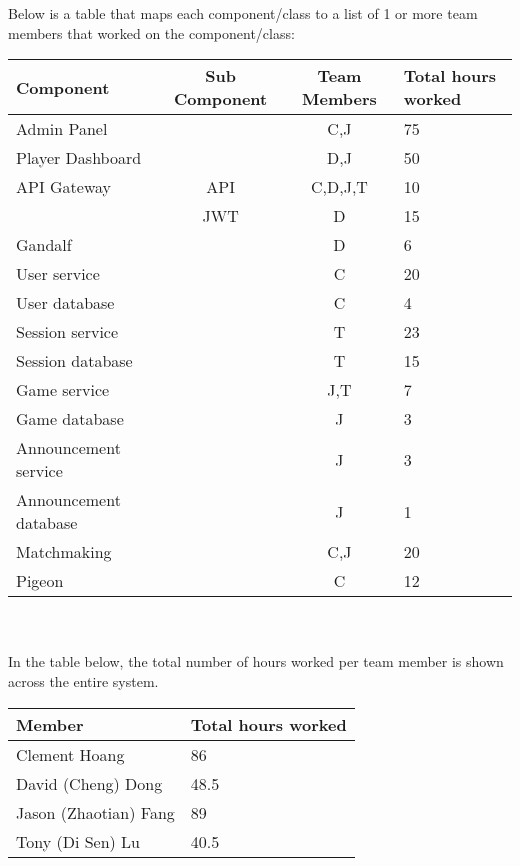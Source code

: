 \documentclass{article}
\begin{document}
Below is a table that maps each component/class to a list of 1 or more team members that worked on the component/class: \\
\begin{tabular}{ | l | c | c | l |  }
	\hline
    Component & Sub Component & Team Members & Total hours worked \\
    \hline
	Admin Panel & & C,J & 75 \\
	\hline
	Player Dashboard & & D,J & 50  \\
	\hline
	API Gateway & API & C,D,J,T & 10 \\
	& JWT & D & 15 \\
	\hline
	Gandalf & & D & 6  \\
	\hline
	User service & & C & 20 \\
	User database & & C & 4 \\
	\hline
	Session service & & T & 23 \\
	Session database & & T & 15 \\
	\hline
	Game service & & J,T & 7 \\
	Game database & & J & 3 \\
	\hline
	Announcement service & & J & 3 \\
	Announcement database & & J & 1 \\
	\hline
	Matchmaking & & C,J & 20 \\
	\hline
	Pigeon & & C & 12 \\
    \hline
\end{tabular} \\ \\

In the table below, the total number of hours worked per team member is shown across the entire system. \\
\begin{tabular}{ | l | l | }
	\hline
    Member & Total hours worked \\
    \hline
  	Clement Hoang & 86 \\
  	David (Cheng) Dong & 48.5 \\
	  Jason (Zhaotian) Fang & 89 \\
	  Tony (Di Sen) Lu & 40.5 \\
    \hline
\end{tabular}
\end{document}
